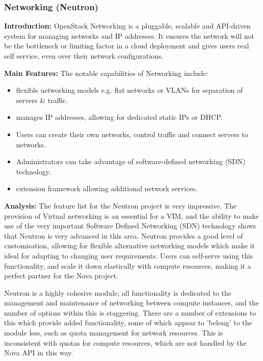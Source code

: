 \subsubsection{Networking (Neutron)}

\textbf{Introduction:}
OpenStack Networking is a pluggable, scalable and API-driven system for managing networks and IP addresses. It ensures the network will not be the bottleneck or limiting factor in a cloud deployment and gives users real self service, even over their network configurations\cite{openstacknetwork}.

\textbf{Main Features:}
The notable capabilities of Networking include\cite{openstacknetwork}: 
\begin{itemize}
\itemsep0em
\item flexible networking models e.g. flat networks or VLANs for separation of servers \& traffic.
\item manages IP addresses, allowing for dedicated static IPs or DHCP. 
\item Users can create their own networks, control traffic and connect servers to networks.
\item Administrators can take advantage of software-defined networking (SDN) technology.
\item extension framework allowing additional network services.
\end{itemize}

\textbf{Analysis: }
The feature list for the Neutron project is very impressive. The provision of Virtual networking is an essential for a VIM, and the ability to make use of the very important Software Defined Networking (SDN) technology shows that Neutron is very advanced in this area. Neutron provides a good level of customisation, allowing for flexible alternative networking models which make it ideal for adapting to changing user requirements. Users can self-serve using this functionality, and scale it down elastically with compute resources, making it a perfect partner for the Nova project. 

Neutron is a highly cohesive module; all functionality is dedicated to the management and maintenance of networking between compute instances, and the number of options within this is staggering. There are a number of extensions to this which provide added functionality, some of which appear to 'belong' to the module less, such as quota management for network resources. This is inconsistent with quotas for compute resources, which are not handled by the Nova API in this way.  

